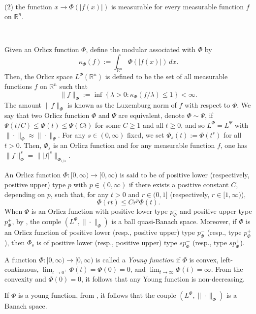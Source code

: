 \documentclass[oneside,10pt]{article}
\begin{document}
(2) the function $x \to \Phi(\vert f(x) \vert)$ is measurable for every measurable function $f$ on $\mathbb{R}^n$.

\

Given an Orlicz function $\Phi$, define the modular associated with $\Phi$ by
\[
\kappa_{\Phi}(f) := \int_{\mathbb{R}^n} \Phi(|f(x)|) \, dx.
\]
Then, the Orlicz space $L^{\Phi}(\mathbb{R}^n)$ is defined to be the set of all measurable functions $f$ on $\mathbb{R}^n$ such that
\[
\| f \|_{\Phi} := \inf \left\{ \lambda > 0 : \kappa_{\Phi}(f/\lambda) \leq 1 \right\} < \infty. 
\]
The amount $\| f \|_{\Phi}$ is known as the Luxemburg norm of $f$ with respect to $\Phi$. We say that two Orlicz function $\Phi$ and $\Psi$ are equivalent, denote $\Phi \sim \Psi$, if $\Psi(t/C) \leq \Phi(t) \leq \Psi(Ct)$ for some $C \geq 1$ and all $t \geq 0$, and so 
$L^{\Phi} = L^{\Psi}$ with $\| \cdot \|_{\Phi} \approx  \| \cdot \|_{\Psi}$. For any $s \in (0, \infty)$ fixed, we set 
$\Phi_s(t) := \Phi(t^s)$ for all $t >0$. Then, $\Phi_s$ is an Orlicz function and for any measurable function $f$, one has 
$\| f \|_{\Phi}^{s} = \| |f|^s \|_{\Phi_{1/s}}$.  


An Orlicz function $\Phi : [0, \infty) \to [0, \infty)$ is said to be of positive lower (respectively, positive upper) type $p$ with 
$p \in (0, \infty)$ if there exists a positive constant $C$, depending on $p$, such that, for any $t >0$ and $r \in (0,1]$ (respectively, 
$r \in [1, \infty)$),
\begin{equation} \label{lower upper type}
\Phi(rt) \leq C r^p \Phi(t).
\end{equation}
When $\Phi$ is an Orlicz function with positive lower type $p_{\Phi}^{-}$ and positive upper type $p_{\Phi}^{+}$, by \cite[p. 92]{sawa}, the couple $(L^{\Phi}, \| \cdot \|_{\Phi})$ is a ball quasi-Banach space. Moreover, if $\Phi$ is an Orlicz function of positive lower (resp., positive upper) type $p_{\Phi}^{-}$ (resp., type $p_{\Phi}^{+}$),  then $\Phi_s$ is of positive lower (resp., positive upper) type  
$s p_{\Phi}^{-}$ (resp., type $s p_{\Phi}^{+}$). 


A function $\Phi : [0, \infty) \to [0, \infty)$ is called a \textit{Young function} if $\Phi$ is convex, left-continuous, $\lim_{t \to 0^{+}} \Phi(t) = \Phi(0) = 0$, and $\lim_{t \to \infty} \Phi(t) = \infty$. From the convexity and $\Phi(0) = 0$, it follows that any Young function is non-decreasing.

If $\Phi$ is a young function, from \cite[Lemma 3.2.2 (b) and Theorem 3.3.7 (b)]{Hasto}, it follows that the couple 
$(L^{\Phi}, \| \cdot \|_{\Phi})$ is a Banach space.
\end{document}
